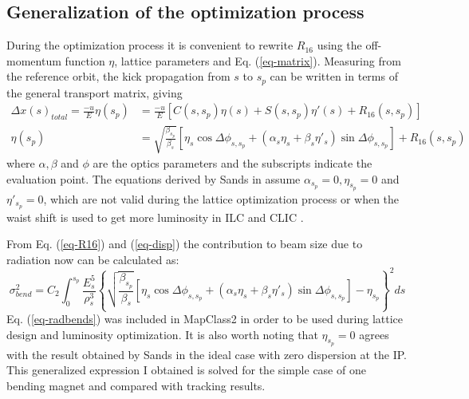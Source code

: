 \subsection{Generalization of the optimization process}\label{s:thebeamrad}
During the optimization process it is convenient to rewrite $R_{16}$ using the off-momentum function $\eta$, lattice parameters and Eq. (\ref{eq-matrix}). Measuring from the reference orbit, the kick propagation from $s$ to $s_p$ can be written in terms of the general transport matrix, giving
\begin{align}
\Delta x(s)_{total}=\frac{-u}{E}\eta(s_p) &= \frac{-u}{E} \left[C(s,s_p)\eta(s) + S(s,s_p)\eta'(s) + R_{16}(s,s_p)\right]\\
\eta(s_p) &= \sqrt{\frac{\beta_{s_p}}{\beta_s}}\left[\eta_s\cos\Delta\phi_{s,s_p}+(\alpha_s\eta_s+\beta_s\eta'_s)\sin\Delta\phi_{s,s_p}\right] + R_{16}(s,s_p)\label{eq-disp}
\end{align}
where $\alpha, \beta$ and $\phi$ are the optics parameters and the subscripts indicate the evaluation point. The equations derived by Sands in \cite{Sands} assume $\alpha_{s_p}=0, \eta_{s_p}=0$ and $\eta'_{s_p}=0$, which are not valid during the lattice optimization process or when the waist shift is used to get more luminosity in ILC and CLIC \cite{PhysRevSTAB.16.041001}.\par
From Eq. (\ref{eq-R16}) and (\ref{eq-disp}) the contribution to beam size due to radiation now can be calculated as:
\begin{equation}
 \sigma_{bend}^2=C_2 \int_0^{s_p} \frac{E^5_s}{\rho^3_s}\left\{\sqrt{\frac{\beta_{s_p}}{\beta_s}}\left[\eta_s\cos\Delta\phi_{s,s_p}+(\alpha_s\eta_s+\beta_s\eta'_s)\sin\Delta\phi_{s,s_p}\right]-\eta_{s_p}\right\}^2ds\label{eq-radbends}
\end{equation}
Eq. (\ref{eq-radbends}) was included in MapClass2 in order to be used during lattice design and luminosity optimization. It is also worth noting that $\eta_{s_p}=0$ agrees with the result obtained by Sands in the ideal case with zero dispersion at the IP. This generalized expression I obtained is solved for the simple case of one bending magnet and compared with tracking results.

